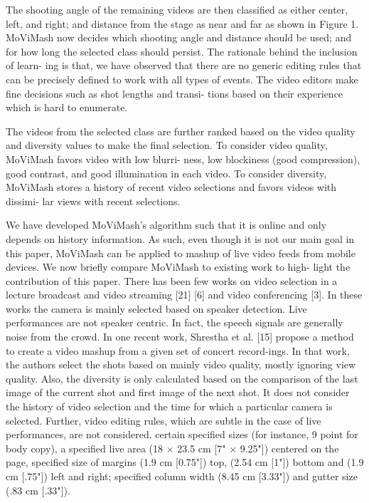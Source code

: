\documentclass{sig-alternate-05-2015}
\begin{document}
The shooting angle of the remaining videos are then classified as
either center, left, and right; and distance from the stage as near and
far as shown in Figure 1. MoViMash now decides which shooting angle and
distance should be used; and for how long the selected class should
persist. The rationale behind the inclusion of learn-
ing is that, we have observed that there are no generic editing rules
that can be precisely defined to work with all types of events. The
video editors make fine decisions such as shot lengths and transi-
tions based on their experience which is hard to enumerate.

The videos from the selected class are further ranked based on
the video quality and diversity values to make the final selection.
To consider video quality, MoViMash favors video with low blurri-
ness, low blockiness (good compression), good contrast, and good
illumination in each video. To consider diversity, MoViMash stores
a history of recent video selections and favors videos with dissimi-
lar views with recent selections.

We have developed MoViMash’s algorithm such that it is online
and only depends on history information. As such, even though
it is not our main goal in this paper, MoViMash can be applied to
mashup of live video feeds from mobile devices.
We now briefly compare MoViMash to existing work to high-
light the contribution of this paper. There has been few works on
video selection in a lecture broadcast and video streaming [21] [6]
and video conferencing [3]. In these works the camera is mainly
selected based on speaker detection. Live performances are not
speaker centric. In fact, the speech signals are generally noise from
the crowd. In one recent work, Shrestha et al. [15] propose a
method to create a video mashup from a given set of concert record-ings. In that work, the authors select the shots based on mainly video quality, mostly ignoring view quality. Also, the diversity is
only calculated based on the comparison of the last image of the
current shot and first image of the next shot. It does not consider
the history of video selection and the time for which a particular
camera is selected. Further, video editing rules, which are subtle in
the case of live performances, are not considered.
certain specified sizes (for instance, 9 point for body copy),
a specified live area (18 $\times$ 23.5 cm [7" $\times$ 9.25"]) centered on
the page, specified size of margins (1.9 cm [0.75"]) top, (2.54 cm [1"]) bottom
and (1.9 cm [.75"]) left and right; specified column width
(8.45 cm [3.33"]) and gutter size (.83 cm [.33"]).
\end{document}
